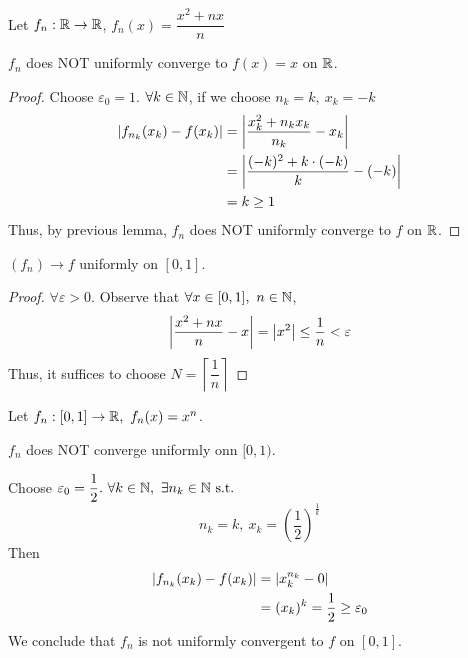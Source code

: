 \documentclass[a4paper,12pt]{article}
\begin{document}
\begin{example} Let \(f_n:\mathbb{R}\rightarrow\mathbb{R}\), \(f_n(x)=\dfrac{x^2+nx}{n}\)
    
     \(f_n\) does NOT uniformly converge to \(f(x)=x\) on \(\mathbb{R}\).
    \begin{proof}
        Choose \(\varepsilon_0=1\). \(\forall k\in\mathbb{N}\), if we choose \(n_k=k,\ x_k=-k\)
        \begin{align*}
            \left\lvert f_{n_k}(x_k)-f(x_k)\right\rvert&=\left\lvert \frac{x_k^2+n_kx_k}{n_k}-x_k\right\rvert\\
            &=\left\lvert \frac{(-k)^2+k\cdot(-k)}{k}-(-k)\right\rvert\\
            &=k\ge 1
        \end{align*} 
        Thus, by previous lemma, \(f_n\) does NOT uniformly converge to \(f\) on \(\mathbb{R}\).
    \end{proof}

     \((f_n)\rightarrow f\) uniformly on \([0,1]\).
    \begin{proof}
        \(\forall \varepsilon>0\). Observe that \(\forall x\in[0,1],\ n\in\N\),
        \[\left\lvert \frac{x^2+nx}{n}-x\right\rvert=\left\lvert x^2\right\rvert\le \frac{1}{n}<\varepsilon\]
        Thus, it suffices to choose \(N=\left\lceil\dfrac{1}{n}\right\rceil\)
    \end{proof}
\end{example}

\begin{example}
    Let \(f_n:[0,1]\rightarrow\R,\ f_n(x)=x^n\).

     \(f_n\) does NOT converge uniformly onn \([0,1)\). 

    Choose \(\varepsilon_0=\dfrac{1}{2}.\ \forall k\in\N,\ \exists n_k\in\N\st\)
    \[n_k=k,\ x_k=(\frac{1}{2})^{\frac{1}{k}}\]
    Then \begin{align*}
        \left\lvert f_{n_k}(x_k)-f(x_k)\right\rvert&=\left\lvert x_k^{n_k}-0\right\rvert\\
        &=(x_k)^k=\frac{1}{2}\ge\varepsilon_0
    \end{align*}
    We conclude that \(f_n\) is not uniformly convergent to \(f\) on \([0,1]\).
\end{example}
\end{document}
